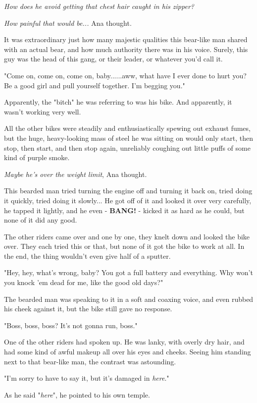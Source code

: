 \documentclass[
]{article}
\begin{document}
\emph{How does he avoid getting that chest hair caught in his zipper?}

\emph{How painful that would be...} Ana thought.

It was extraordinary just how many majestic qualities this bear-like man
shared with an actual bear, and how much authority there was in his
voice. Surely, this guy was the head of this gang, or their leader, or
whatever you'd call it.

"Come on, come on, come on, baby......aww, what have I ever done to hurt
you? Be a good girl and pull yourself together. I'm begging you."

Apparently, the "bitch" he was referring to was his bike. And
apparently, it wasn't working very well.

All the other bikes were steadily and enthusiastically spewing out
exhaust fumes, but the huge, heavy-looking mass of steel he was sitting
on would only start, then stop, then start, and then stop again,
unreliably coughing out little puffs of some kind of purple smoke.

\emph{Maybe he's over the weight limit}, Ana thought.

This bearded man tried turning the engine off and turning it back on,
tried doing it quickly, tried doing it slowly... He got off of it and
looked it over very carefully, he tapped it lightly, and he even -
\textbf{BANG! }- kicked it as hard as he could, but none of it did any
good.

The other riders came over and one by one, they knelt down and looked
the bike over. They each tried this or that, but none of it got the bike
to work at all. In the end, the thing wouldn't even give half of a
sputter.

"Hey, hey, what's wrong, baby? You got a full battery and everything.
Why won't you knock 'em dead for me, like the good old days?"

The bearded man was speaking to it in a soft and coaxing voice, and even
rubbed his cheek against it, but the bike still gave no response.

"Boss, boss, boss? It's not gonna run, boss."

One of the other riders had spoken up. He was lanky, with overly dry
hair, and had some kind of awful makeup all over his eyes and cheeks.
Seeing him standing next to that bear-like man, the contrast was
astounding.

"I'm sorry to have to say it, but it's damaged in \emph{here}."

As he said "\emph{here}", he pointed to his own temple.
\end{document}
